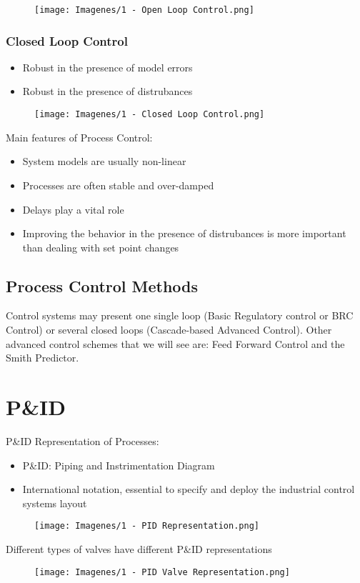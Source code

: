 \begin{figure}[H]
    \centering
    \texttt{[image: Imagenes/1 - Open Loop Control.png]}
    \label{Fig: 1 - Open Loop Control}
\end{figure}

\subsubsection{Closed Loop Control}
\begin{itemize}
    \item Robust in the presence of model errors
    \item Robust in the presence of distrubances
\end{itemize}

\begin{figure}[H]
    \centering
    \texttt{[image: Imagenes/1 - Closed Loop Control.png]}
    \label{Fig: 1 - Closed Loop Control}
\end{figure}

Main features of Process Control:
\begin{itemize}
    \item System models are usually non-linear
    \item Processes are often stable and over-damped
    \item Delays play a vital role
    \item Improving the behavior in the presence of distrubances is more important than dealing with set point changes
\end{itemize}

\subsection{Process Control Methods}
Control systems may present one single loop (Basic Regulatory control or BRC Control) or several closed loops (Cascade-based Advanced Control). Other advanced control schemes that we will see are: Feed Forward Control and the Smith Predictor.

\section{P\&ID}
P\&ID Representation of Processes:
\begin{itemize}
    \item P\&ID: Piping and Instrimentation Diagram
    \item International notation, essential to specify and deploy the industrial control systems layout
\end{itemize}

\begin{figure}[H]
    \centering
    \texttt{[image: Imagenes/1 - PID Representation.png]}
    \label{Fig: 1 - PID Representation}
\end{figure}

Different types of valves have different P\&ID representations
\begin{figure}[H]
    \centering
    \texttt{[image: Imagenes/1 - PID Valve Representation.png]}
    \label{Fig: 1 - PID Valve Representation}
\end{figure}